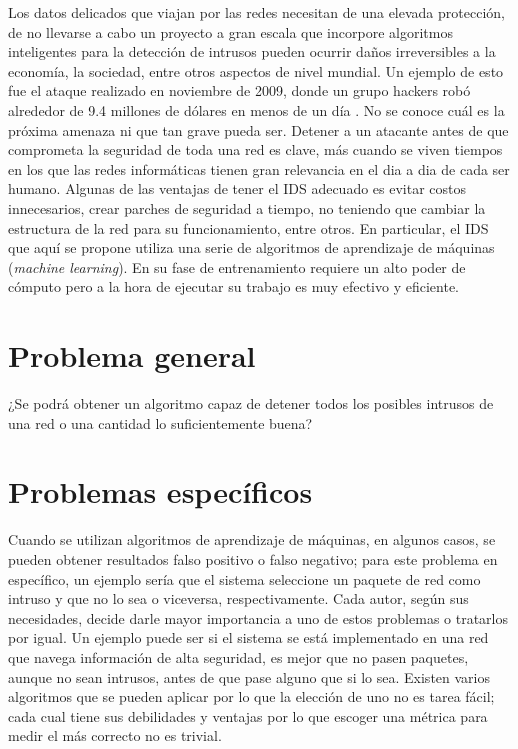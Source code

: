 Los datos delicados que viajan por las redes necesitan de una elevada protección, de no llevarse a cabo un proyecto a gran escala que incorpore algoritmos inteligentes para la detección de intrusos pueden ocurrir daños irreversibles a la economía, la sociedad, entre otros aspectos de nivel mundial. Un ejemplo de esto fue el ataque realizado en noviembre de 2009, donde un grupo hackers robó alrededor de 9.4 millones de dólares en menos de un día \cite{harper2011gray}. No se conoce cuál es la próxima amenaza ni que tan grave pueda ser. Detener a un atacante antes de que comprometa la seguridad de toda una red es clave, más cuando se viven tiempos en los que las redes informáticas tienen gran relevancia en el dia a dia de cada ser humano. Algunas de las ventajas de tener el IDS adecuado es evitar costos innecesarios, crear parches de seguridad a tiempo, no teniendo que cambiar la estructura de la red para su funcionamiento, entre otros. En particular, el IDS que aquí se propone utiliza una serie de algoritmos de aprendizaje de máquinas (\textit{machine learning}). En su fase de entrenamiento requiere un alto poder de cómputo pero a la hora de ejecutar su trabajo es muy efectivo y eficiente.

\section*{Problema general}
¿Se podrá obtener un algoritmo capaz de detener todos los posibles intrusos de una red o una cantidad lo suficientemente buena?

\section*{Problemas específicos}
Cuando se utilizan algoritmos de aprendizaje de máquinas, en algunos casos, se pueden obtener resultados falso positivo o falso negativo; para este problema en específico, un ejemplo sería que el sistema seleccione un paquete de red como intruso y que no lo sea o viceversa, respectivamente. Cada autor, según sus necesidades, decide darle mayor importancia a uno de estos problemas o tratarlos por igual. Un ejemplo puede ser si el sistema se está implementado en una red que navega información de alta seguridad, es mejor que no pasen paquetes, aunque no sean intrusos, antes de que pase alguno que si lo sea. Existen varios algoritmos que se pueden aplicar por lo que la elección de uno no es tarea fácil; cada cual tiene sus debilidades y ventajas por lo que escoger una métrica para medir el más correcto no es trivial.

